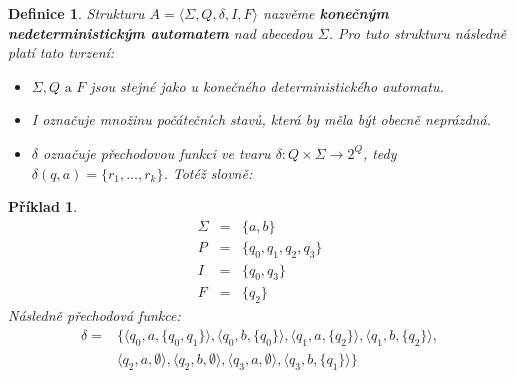 \documentclass[10pt, a4paper, titlepage]{article}
\theoremstyle{note}
\newtheorem{definice}{Definice}
\newtheorem{priklad}{Příklad}
\begin{document}
\begin{definice}
Strukturu $A = \langle \Sigma, Q, \delta, I, F \rangle$ nazvěme \textbf{konečným nedeterministickým automatem} nad abecedou $\Sigma$. Pro tuto strukturu následně platí tato tvrzení:
\begin{itemize}
\item
$\Sigma, Q \text{ a } F$ jsou stejné jako u konečného deterministického automatu.
\item
\textit{I} označuje množinu počátečních stavů, která by měla být obecně neprázdná.
\item
$\delta$ označuje přechodovou funkci ve tvaru $\delta : Q \times \Sigma \rightarrow 2^{Q}$, tedy $\delta (q, a) = \lbrace r_{1}, \ldots, r_{k} \rbrace$. Totéž slovně: 
\end{itemize}
\end{definice}

\begin{priklad}\label{priklad-3}
\begin{eqnarray*}
\Sigma &=& \lbrace a, b \rbrace \\
P &=& \lbrace q_{0}, q_{1}, q_{2}, q_{3} \rbrace \\
I &=& \lbrace q_{0}, q_{3} \rbrace \\
F &=& \lbrace q_{2} \rbrace 
\end{eqnarray*}
Následně přechodová funkce:
\begin{eqnarray*}
\delta =&
\lbrace
\langle q_{0}, a, \lbrace q_{0},q_{1} \rbrace \rangle,
\langle q_{0}, b, \lbrace q_{0} \rbrace \rangle,
\langle q_{1}, a, \lbrace q_{2} \rbrace \rangle,
\langle q_{1}, b, \lbrace q_{2} \rbrace \rangle, \\
& \langle q_{2}, a, \emptyset \rangle,
\langle q_{2}, b, \emptyset \rangle,
\langle q_{3}, a, \emptyset \rangle,
\langle q_{3}, b, \lbrace q_{1} \rbrace \rangle 
\rbrace
\end{eqnarray*}
\end{priklad}
\end{document}
